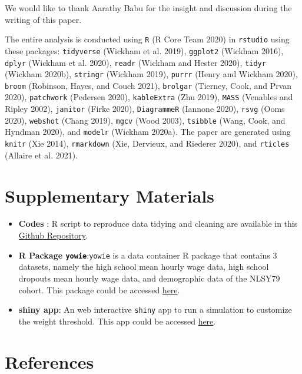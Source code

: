 \documentclass{article}
\begin{document}
We would like to thank Aarathy Babu for the insight and discussion during the writing of this paper.

The entire analysis is conducted using \texttt{R} (R Core Team 2020) in \texttt{rstudio} using these packages: \texttt{tidyverse} (Wickham et al. 2019), \texttt{ggplot2} (Wickham 2016), \texttt{dplyr} (Wickham et al. 2020), \texttt{readr} (Wickham and Hester 2020), \texttt{tidyr} (Wickham 2020b), \texttt{stringr} (Wickham 2019), \texttt{purrr} (Henry and Wickham 2020), \texttt{broom} (Robinson, Hayes, and Couch 2021), \texttt{brolgar} (Tierney, Cook, and Prvan 2020), \texttt{patchwork} (Pedersen 2020), \texttt{kableExtra} (Zhu 2019), \texttt{MASS} (Venables and Ripley 2002), \texttt{janitor} (Firke 2020), \texttt{DiagrammeR} (Iannone 2020), \texttt{rsvg} (Ooms 2020), \texttt{webshot} (Chang 2019), \texttt{mgcv} (Wood 2003), \texttt{tsibble} (Wang, Cook, and Hyndman 2020), and \texttt{modelr} (Wickham 2020a). The paper are generated using \texttt{knitr} (Xie 2014), \texttt{rmarkdown} (Xie, Dervieux, and Riederer 2020), and \texttt{rticles} (Allaire et al. 2021).

\hypertarget{supplementary-materials}{%
\section{Supplementary Materials}\label{supplementary-materials}}

\begin{itemize}
\item
  \textbf{Codes} : R script to reproduce data tidying and cleaning are available in this \href{https://github.com/numbats/yowie/blob/master/data-raw/data_preprocessing.R}{Github Repository}.
\item
  \textbf{R Package \texttt{yowie}}:\texttt{yowie} is a data container R package that contains 3 datasets, namely the high school mean hourly wage data, high school dropouts mean hourly wage data, and demographic data of the NLSY79 cohort. This package could be accessed \href{https://github.com/numbats/yowie}{here}.
\item
  \textbf{shiny app}: An web interactive \texttt{shiny} app to run a simulation to customize the weight threshold. This app could be accessed \href{https://github.com/numbats/wages-refresh/tree/main/app}{here}.
\end{itemize}

\hypertarget{references}{%
\section*{References}\label{references}}
\end{document}
